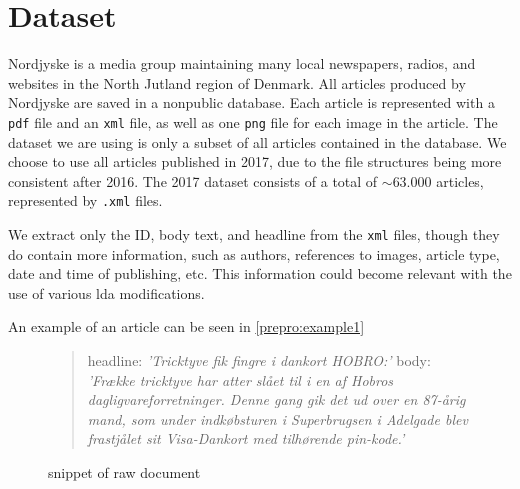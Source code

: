 \section{Dataset}\label{sec:dataset}
Nordjyske is a media group maintaining many local newspapers, radios, and websites in the North Jutland region of Denmark.
All articles produced by Nordjyske are saved in a nonpublic database.
Each article is represented with a \texttt{pdf} file and an \texttt{xml} file, as well as one \texttt{png} file for each image in the article.
The dataset we are using is only a subset of all articles contained in the database.
We choose to use all articles published in 2017, due to the file structures being more consistent after 2016.
The 2017 dataset consists of a total of $\sim 63.000$ articles, represented by \texttt{.xml} files.

We extract only the ID, body text, and headline from the \texttt{xml} files, though they do contain more information, such as authors, references to images, article type, date and time of publishing, etc.
This information could become relevant with the use of various \gls{lda} modifications.

An example of an article can be seen in \autoref{prepro:example1}

\begin{figure}[h]
	\begin{framed}
		\begin{quote}
			headline: \textit{'Tricktyve fik fingre i dankort HOBRO:'}
			body: \textit{'Frække tricktyve har atter slået til i en af Hobros dagligvareforretninger. Denne gang gik det ud over en 87-årig mand, som under indkøbsturen i Superbrugsen i Adelgade blev frastjålet sit Visa-Dankort med tilhørende pin-kode.'}
		\end{quote}
	\end{framed}
		\caption{snippet of raw document}
		\label{prepro:example1}
\end{figure}
